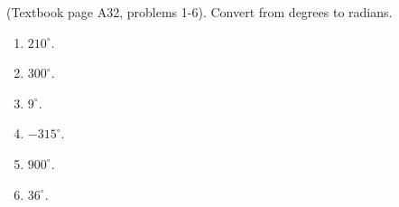 (Textbook page A32, problems 1-6). 
Convert from degrees to radians.
\begin{multicols}{3}
\begin{enumerate}
\item $210^\circ$.
\item $300^\circ$.
\item $9^\circ$.
\item $-315^\circ$.
\item $900^\circ$.
\item $36^\circ$.
\end{enumerate}
\end{multicols}
